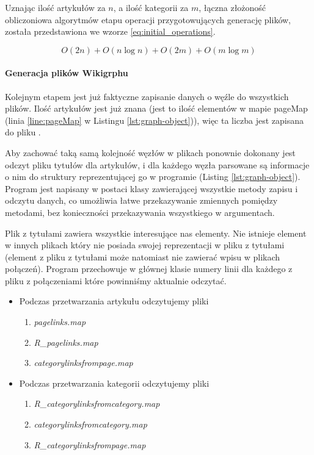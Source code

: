 Uznając ilość artykułów za $n$, a ilość kategorii za $m$, łączna złożoność obliczoniowa algorytmów etapu operacji przygotowujących generację plików, została przedstawiona we wzorze \ref{eq:initial_operations}.

\begin{equation}
O(2n) + O(n\log n) + O(2m) + O(m \log m)
\label{eq:initial_operations}
\end{equation}

\paragraph{Generacja plików Wikigrphu}
Kolejnym etapem jest już faktyczne zapisanie danych o węźle do wszystkich plików. Ilość artykułów jest już znana (jest to ilość elementów w mapie pageMap (linia \ref{line:pageMap} w Listingu \ref{lst:graph-object})), więc ta liczba jest zapisana do pliku .

Aby zachować taką samą kolejność węzłów w plikach ponownie dokonany jest odczyt pliku tytułów dla artykułów, i dla każdego węzła parsowane są informacje o nim do struktury reprezentującej go w programie (Listing \ref{lst:graph-object}). Program jest napisany w postaci klasy zawierającej wszystkie metody zapisu i odczytu danych, co umożliwia łatwe przekazywanie zmiennych pomiędzy metodami, bez konieczności przekazywania wszystkiego w argumentach.

Plik z tytułami zawiera wszystkie interesujące nas elementy. Nie istnieje element w innych plikach który nie posiada swojej reprezentacji w pliku z tytułami (element z pliku z tytułami może natomiast nie zawierać wpisu w plikach połączeń). Program przechowuje w głównej klasie numery linii dla każdego z pliku z połączeniami które powinniśmy aktualnie odczytać.

\begin{itemize}
\item Podczas przetwarzania artykułu odczytujemy pliki
\begin{enumerate}[label=\textbullet]
    \setlength\itemsep{1.1em}
    \item  \textit{pagelinks.map}
    \item  \textit{R\_pagelinks.map}
    \item  \textit{categorylinksfrompage.map}
\end{enumerate}
\item Podczas przetwarzania kategorii odczytujemy pliki
\begin{enumerate}[label=\textbullet]
    \setlength\itemsep{1.1em}
    \item  \textit{R\_categorylinksfromcategory.map}
    \item  \textit{categorylinksfromcategory.map}
    \item  \textit{R\_categorylinksfrompage.map}
\end{enumerate}
\end{itemize}

